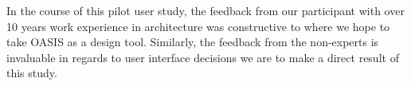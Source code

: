 In the course of this pilot user study, the feedback from our participant with over 10 years work experience in architecture was constructive to where we hope to take OASIS as a design tool.
Similarly, the feedback from the non-experts is invaluable in regards to user interface decisions we are to make a direct result of this study.




































